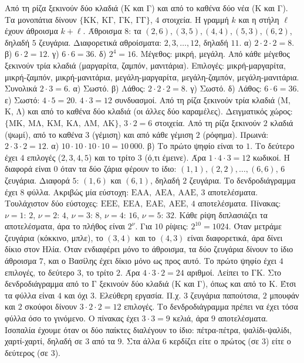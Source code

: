  Από τη ρίζα ξεκινούν δύο κλαδιά (Κ και Γ) και από το καθένα δύο νέα (Κ και Γ). Τα μονοπάτια δίνουν $\{\mathrm{ΚΚ},\ \mathrm{ΚΓ},\ \mathrm{ΓΚ},\ \mathrm{ΓΓ}\}$, $4$ στοιχεία.
 Η γραμμή $k$ και η στήλη $\ell$ έχουν άθροισμα $k+\ell$. Άθροισμα $8$: τα $(2,6),(3,5),(4,4),(5,3),(6,2)$, δηλαδή $5$ ζευγάρια. Διαφορετικά αθροίσματα: $2,3,\dots,12$, δηλαδή $11$.
 α) $2\cdot2\cdot2=8$. β) $6\cdot2=12$. γ) $6\cdot6=36$. δ) $2^4=16$.
 Μέγεθος: μικρή, μεγάλη. Από κάθε μέγεθος ξεκινούν τρία κλαδιά (μαργαρίτα, ζαμπόν, μανιτάρια). Επιλογές: μικρή-μαργαρίτα, μικρή-ζαμπόν, μικρή-μανιτάρια, μεγάλη-μαργαρίτα, μεγάλη-ζαμπόν, μεγάλη-μανιτάρια. Συνολικά $2\cdot3=6$.
 α) Σωστό. β) Λάθος: $2\cdot2\cdot2=8$. γ) Σωστό. δ) Λάθος: $6\cdot6=36$. ε) Σωστό: $4\cdot5=20$.
 $4\cdot3=12$ συνδυασμοί.
 Από τη ρίζα ξεκινούν τρία κλαδιά (Μ, Κ, Λ) και από το καθένα δύο κλαδιά (οι άλλες δύο καραμέλες). Δειγματικός χώρος: $\{\mathrm{ΜΚ},\ \mathrm{ΜΛ},\ \mathrm{ΚΜ},\ \mathrm{ΚΛ},\ \mathrm{ΛΜ},\ \mathrm{ΛΚ}\}$, $3\cdot2=6$ στοιχεία.
 Από τη ρίζα ξεκινούν $2$ κλαδιά (ψωμί), από το καθένα $3$ (γέμιση) και από κάθε γέμιση $2$ (ρόφημα). Πρωινά: $2\cdot3\cdot2=12$.
 α) $10\cdot10\cdot10\cdot10=10\,000$. β) Το πρώτο ψηφίο είναι το $1$. Το δεύτερο έχει $4$ επιλογές ($2,3,4,5$) και το τρίτο $3$ (ό,τι έμεινε). Άρα $1\cdot4\cdot3=12$ κωδικοί.
 Η διαφορά είναι $0$ όταν τα δύο ζάρια φέρουν το ίδιο: $(1,1),(2,2),\dots,(6,6)$, $6$ ζευγάρια. Διαφορά $5$: $(1,6)$ και $(6,1)$, δηλαδή $2$ ζευγάρια.
 Το δενδροδιάγραμμα έχει $8$ φύλλα. Ακριβώς μία εύστοχη: $\mathrm{ΕΑΑ},\ \mathrm{ΑΕΑ},\ \mathrm{ΑΑΕ}$, $3$ αποτελέσματα. Τουλάχιστον δύο εύστοχες: $\mathrm{ΕΕΕ},\ \mathrm{ΕΕΑ},\ \mathrm{ΕΑΕ},\ \mathrm{ΑΕΕ}$, $4$ αποτελέσματα.
 Πίνακας: $\nu=1$: $2$, $\nu=2$: $4$, $\nu=3$: $8$, $\nu=4$: $16$, $\nu=5$: $32$. Κάθε ρίψη διπλασιάζει τα αποτελέσματα, άρα το πλήθος είναι $2^\nu$. Για $10$ ρίψεις: $2^{10}=1024$.
 Όταν μετράμε ζευγάρια (κόκκινο, μπλε), το $(3,4)$ και το $(4,3)$ είναι διαφορετικά, άρα δίνει δίκιο στον Ηλία. Όταν ενδιαφέρει μόνο το άθροισμα, τα δύο ζευγάρια δίνουν το ίδιο άθροισμα $7$, και ο Βασίλης έχει δίκιο μόνο ως προς αυτό.
 Το πρώτο ψηφίο έχει $4$ επιλογές, το δεύτερο $3$, το τρίτο $2$. Άρα $4\cdot3\cdot2=24$ αριθμοί.
 Λείπει το $\mathrm{ΓΚ}$. Στο δενδροδιάγραμμα από το $\mathrm{Γ}$ ξεκινούν δύο κλαδιά (Κ και Γ), όπως και από το Κ. Έτσι τα φύλλα είναι $4$ και όχι $3$.
 Ελεύθερη εργασία. Π.χ. $3$ ζευγάρια παπούτσια, $2$ μπουφάν και $2$ σκούφοι δίνουν $3\cdot2\cdot2=12$ επιλογές. Το δενδροδιάγραμμα πρέπει να έχει τόσα φύλλα όσο το γινόμενο.
 Ο πίνακας έχει $3\cdot3=9$ κελιά, άρα $9$ αποτελέσματα. Ισοπαλία έχουμε όταν οι δύο παίκτες διαλέγουν το ίδιο: πέτρα-πέτρα, ψαλίδι-ψαλίδι, χαρτί-χαρτί, δηλαδή σε $3$ από τα $9$. Στα άλλα $6$ κερδίζει είτε ο πρώτος (σε $3$) είτε ο δεύτερος (σε $3$).
